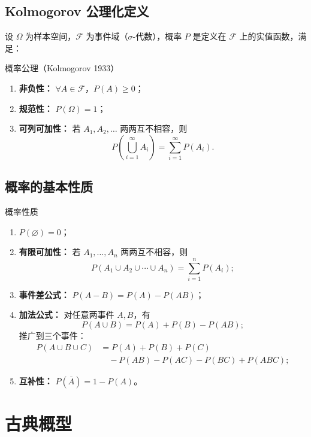 \subsection{Kolmogorov 公理化定义}

设 $\Omega$ 为样本空间，$\mathcal{F}$ 为事件域（$\sigma$-代数），概率 $P$ 是定义在 $\mathcal{F}$ 上的实值函数，满足：

\begin{myhypothesis}{概率公理（Kolmogorov 1933）}
\begin{enumerate}
	\item \textbf{非负性：} $\forall A \in \mathcal{F}$，$P(A) \geq 0$；
	\item \textbf{规范性：} $P(\Omega) = 1$；
	\item \textbf{可列可加性：} 若 $A_1, A_2, \ldots$ 两两互不相容，则
	\[P\!\left(\bigcup_{i=1}^{\infty} A_i\right) = \sum_{i=1}^{\infty} P(A_i).\]
\end{enumerate}
\end{myhypothesis}

\subsection{概率的基本性质}

\begin{myproperty}{概率性质}
\begin{enumerate}
	\item $P(\varnothing) = 0$；
	\item \textbf{有限可加性：} 若 $A_1, \ldots, A_n$ 两两互不相容，则
	\[P(A_1 \cup A_2 \cup \cdots \cup A_n) = \sum_{i=1}^{n} P(A_i);\]
	\item \textbf{事件差公式：} $P(A - B) = P(A) - P(AB)$；
	\item \textbf{加法公式：} 对任意两事件 $A, B$，有
	\[P(A \cup B) = P(A) + P(B) - P(AB);\]
	推广到三个事件：
	\begin{align*}
	P(A \cup B \cup C) &= P(A) + P(B) + P(C) \\
	&\quad - P(AB) - P(AC) - P(BC) + P(ABC);
	\end{align*}
	\item \textbf{互补性：} $P(\overline{A}) = 1 - P(A)$。
\end{enumerate}
\end{myproperty}

\section{古典概型}


